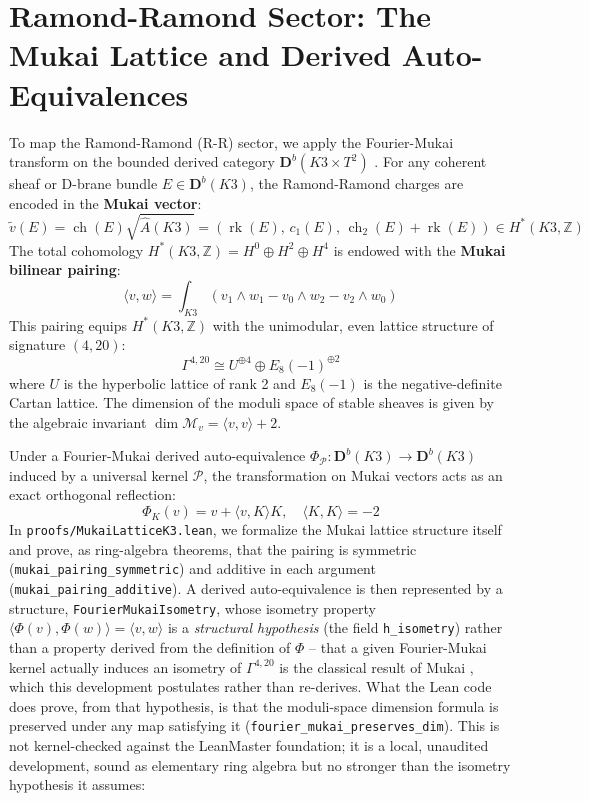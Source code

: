 \documentclass[11pt,a4paper]{article}
\begin{document}
\section{Ramond-Ramond Sector: The Mukai Lattice and Derived Auto-Equivalences}
To map the Ramond-Ramond (R-R) sector, we apply the Fourier-Mukai transform on the bounded derived category $\mathbf{D}^b(K3 \times T^2)$ \cite{mukai1981, orlov1997}. For any coherent sheaf or D-brane bundle $E \in \mathbf{D}^b(K3)$, the Ramond-Ramond charges are encoded in the \textbf{Mukai vector}:
\begin{equation}
\widetilde{v}(E) = \operatorname{ch}(E) \sqrt{\widehat{A}(K3)} = \left( \operatorname{rk}(E), \, c_1(E), \, \operatorname{ch}_2(E) + \operatorname{rk}(E) \right) \in H^*(K3, \mathbb{Z})
\end{equation}
The total cohomology $H^*(K3, \mathbb{Z}) = H^0 \oplus H^2 \oplus H^4$ is endowed with the \textbf{Mukai bilinear pairing}:
\begin{equation}
\label{eq:mukai_pairing}
\langle v, w \rangle = \int_{K3} (v_1 \wedge w_1 - v_0 \wedge w_2 - v_2 \wedge w_0)
\end{equation}
This pairing equips $H^*(K3, \mathbb{Z})$ with the unimodular, even lattice structure of signature $(4, 20)$:
\begin{equation}
\Gamma^{4, 20} \cong U^{\oplus 4} \oplus E_8(-1)^{\oplus 2}
\end{equation}
where $U$ is the hyperbolic lattice of rank 2 and $E_8(-1)$ is the negative-definite Cartan lattice.
The dimension of the moduli space of stable sheaves is given by the algebraic invariant $\dim \mathcal{M}_v = \langle v, v \rangle + 2$.

Under a Fourier-Mukai derived auto-equivalence $\Phi_{\mathcal{P}}: \mathbf{D}^b(K3) \to \mathbf{D}^b(K3)$ induced by a universal kernel $\mathcal{P}$, the transformation on Mukai vectors acts as an exact orthogonal reflection:
\begin{equation}
\Phi_K(v) = v + \langle v, K \rangle K, \quad \langle K, K \rangle = -2
\end{equation}
In \texttt{proofs/MukaiLatticeK3.lean}, we formalize the Mukai lattice structure itself and prove, as ring-algebra theorems, that the pairing is symmetric (\texttt{mukai\_pairing\_symmetric}) and additive in each argument (\texttt{mukai\_pairing\_additive}). A derived auto-equivalence is then represented by a structure, \texttt{FourierMukaiIsometry}, whose isometry property $\langle \Phi(v), \Phi(w) \rangle = \langle v, w \rangle$ is a \emph{structural hypothesis} (the field \texttt{h\_isometry}) rather than a property derived from the definition of $\Phi$ -- that a given Fourier-Mukai kernel actually induces an isometry of $\Gamma^{4,20}$ is the classical result of Mukai \cite{mukai1981}, which this development postulates rather than re-derives. What the Lean code does prove, from that hypothesis, is that the moduli-space dimension formula is preserved under any map satisfying it (\texttt{fourier\_mukai\_preserves\_dim}). This is not kernel-checked against the LeanMaster foundation; it is a local, unaudited development, sound as elementary ring algebra but no stronger than the isometry hypothesis it assumes:
\end{document}
